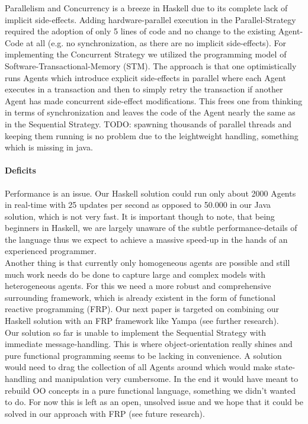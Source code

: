 Parallelism and Concurrency is a breeze in Haskell due to its complete lack of implicit side-effects. Adding hardware-parallel execution in the Parallel-Strategy required the adoption of only 5 lines of code and no change to the existing Agent-Code at all (e.g. no synchronization, as there are no implicit side-effects). For implementing the Concurrent Strategy we utilized the programming model of Software-Transactional-Memory (STM). The approach is that one optimistically runs Agents which introduce explicit side-effects in parallel where each Agent executes in a transaction and then to simply retry the transaction if another Agent has made concurrent side-effect modifications. This frees one from thinking in terms of synchronization and leaves the code of the Agent nearly the same as in the Sequential Strategy.
TODO: spawning thousands of parallel threads and keeping them running is no problem due to the leightweight handling, something which is missing in java.

\paragraph{Deficits}
Performance is an issue. Our Haskell solution could run only about 2000 Agents in real-time with 25 updates per second as opposed to 50.000 in our Java solution, which is not very fast. It is important though to note, that being beginners in Haskell, we are largely unaware of the subtle performance-details of the language thus we expect to achieve a massive speed-up in the hands of an experienced programmer. \\

Another thing is that currently only homogeneous agents are possible and still much work needs do be done to capture large and complex models with heterogeneous agents. For this we need a more robust and comprehensive surrounding framework, which is already existent in the form of functional reactive programming (FRP). Our next paper is targeted on combining our Haskell solution with an FRP framework like Yampa (see further research). \\ 

Our solution so far is unable to implement the Sequential Strategy with immediate message-handling. This is where object-orientation really shines and pure functional programming seems to be lacking in convenience. A solution would need to drag the collection of all Agents around which would make state-handling and manipulation very cumbersome. In the end it would have meant to rebuild OO concepts in a pure functional language, something we didn't wanted to do. For now this is left as an open, unsolved issue and we hope that it could be solved in our approach with FRP (see future research).

